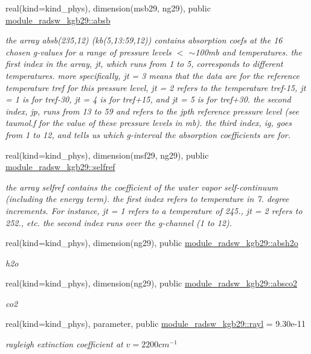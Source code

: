 \begin{Indent}
\begin{DoxyCompactItemize}
real(kind=kind\+\_\+phys), dimension(msb29, ng29), public \hyperlink{group__module__radsw__kgbnn_gac9fb794bc4e4a02964b5e5d1431c31c3}{module\+\_\+radsw\+\_\+kgb29\+::absb}
\begin{DoxyCompactList}\small\item\em the array absb(235,12) (kb(5,13\+:59,12)) contains absorption coefs at the 16 chosen g-\/values for a range of pressure levels $<$ $\sim$100mb and temperatures. the first index in the array, jt, which runs from 1 to 5, corresponds to different temperatures. more specifically, jt = 3 means that the data are for the reference temperature tref for this pressure level, jt = 2 refers to the temperature tref-\/15, jt = 1 is for tref-\/30, jt = 4 is for tref+15, and jt = 5 is for tref+30. the second index, jp, runs from 13 to 59 and refers to the jpth reference pressure level (see taumol.\+f for the value of these pressure levels in mb). the third index, ig, goes from 1 to 12, and tells us which g-\/interval the absorption coefficients are for. \end{DoxyCompactList}\item 
real(kind=kind\+\_\+phys), dimension(msf29, ng29), public \hyperlink{group__module__radsw__kgbnn_ga468e2dd6001734d10784c8fb7b5df4e3}{module\+\_\+radsw\+\_\+kgb29\+::selfref}
\begin{DoxyCompactList}\small\item\em the array selfref contains the coefficient of the water vapor self-\/continuum (including the energy term). the first index refers to temperature in 7. degree increments. For instance, jt = 1 refers to a temperature of 245., jt = 2 refers to 252., etc. the second index runs over the g-\/channel (1 to 12). \end{DoxyCompactList}\item 
real(kind=kind\+\_\+phys), dimension(ng29), public \hyperlink{group__module__radsw__kgbnn_gacab70725ca7faf002f04306fe1798e02}{module\+\_\+radsw\+\_\+kgb29\+::absh2o}
\begin{DoxyCompactList}\small\item\em h2o \end{DoxyCompactList}\item 
real(kind=kind\+\_\+phys), dimension(ng29), public \hyperlink{group__module__radsw__kgbnn_gaa9a57e32dfbb8979478aa8c931ff0e2d}{module\+\_\+radsw\+\_\+kgb29\+::absco2}
\begin{DoxyCompactList}\small\item\em co2 \end{DoxyCompactList}\item 
real(kind=kind\+\_\+phys), parameter, public \hyperlink{group__module__radsw__kgbnn_gabc0a41a10d73674e124115fe0511cc23}{module\+\_\+radsw\+\_\+kgb29\+::rayl} = 9.\+30e-\/11
\begin{DoxyCompactList}\small\item\em rayleigh extinction coefficient at $v=2200cm^{-1}$ \end{DoxyCompactList}\end{DoxyCompactItemize}
\end{Indent}


